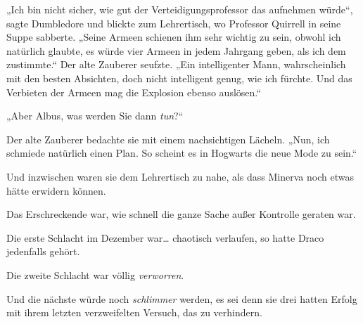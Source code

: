 „Ich bin nicht sicher, wie gut der Verteidigungsprofessor das aufnehmen würde“, sagte Dumbledore und blickte zum Lehrertisch, wo Professor Quirrell in seine Suppe sabberte. „Seine Armeen schienen ihm sehr wichtig zu sein, obwohl ich natürlich glaubte, es würde vier Armeen in jedem Jahrgang geben, als ich dem zustimmte.“ Der alte Zauberer seufzte. „Ein intelligenter Mann, wahrscheinlich mit den besten Absichten, doch nicht intelligent genug, wie ich fürchte. Und das Verbieten der Armeen mag die Explosion ebenso auslösen.“

„Aber Albus, was werden Sie dann \emph{tun}?“

Der alte Zauberer bedachte sie mit einem nachsichtigen Lächeln. „Nun, ich schmiede natürlich einen Plan. So scheint es in Hogwarts die neue Mode zu sein.“

Und inzwischen waren sie dem Lehrertisch zu nahe, als dass Minerva noch etwas hätte erwidern können.

\later

Das Erschreckende war, wie schnell die ganze Sache außer Kontrolle geraten war.

Die erste Schlacht im Dezember war… chaotisch verlaufen, so hatte Draco jedenfalls gehört.

Die zweite Schlacht war völlig \emph{verworren}.

Und die nächste würde noch \emph{schlimmer} werden, es sei denn sie drei hatten Erfolg mit ihrem letzten verzweifelten Versuch, das zu verhindern.

